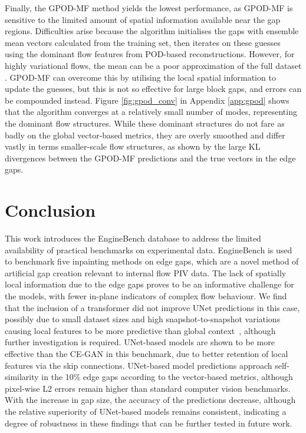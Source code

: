 \documentclass{article}
\begin{document}
Finally, the GPOD-MF method yields the lowest performance, as GPOD-MF is sensitive to the limited amount of spatial information available near the gap regions. Difficulties arise because the algorithm initialises the gaps with ensemble mean vectors calculated from the training set, then iterates on these guesses using the dominant flow features from POD-based reconstructions. However, for highly variational flows, the mean can be a poor approximation of the full dataset \cite{baker2023dynamic}. GPOD-MF can overcome this by utilising the local spatial information to update the guesses, but this is not so effective for large block gaps, and errors can be compounded instead. Figure \ref{fig:gpod_conv} in Appendix \ref{app:gpod} shows that the algorithm converges at a relatively small number of modes, representing the dominant flow structures. While these dominant structures do not fare as badly on the global vector-based metrics, they are overly smoothed and differ vastly in terms smaller-scale flow structures, as shown by the large KL divergences between the GPOD-MF predictions and the true vectors in the edge gaps.

\section{Conclusion}
\label{sec:concl}
This work introduces the EngineBench database to address the limited availability of practical benchmarks on experimental data.
EngineBench is used to benchmark five inpainting methods on edge gaps, which are a novel method of artificial gap creation relevant to internal flow PIV data. The lack of spatially local information due to the edge gaps proves to be an informative challenge for the models, with fewer in-plane indicators of complex flow behaviour. We find that the inclusion of a transformer did not improve UNet predictions in this case, possibly due to small dataset sizes and high snapshot-to-snapshot variations causing local features to be more predictive than global context~\cite{baker2023dynamic}, although further investigation is required. UNet-based models are shown to be more effective than the CE-GAN in this benchmark, due to better retention of local features via the skip connections. UNet-based model predictions approach self-similarity in the 10\% edge gaps according to the vector-based metrics, although pixel-wise L2 errors remain higher than standard computer vision benchmarks. With the increase in gap size, the accuracy of the predictions decrease, although the relative superiority of UNet-based models remains consistent, indicating a degree of robustness in these findings that can be further tested in future work.
\end{document}
